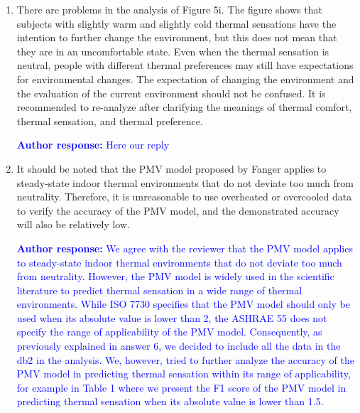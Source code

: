 \documentclass[a4paper, 10pt]{letter}
\newcommand{\response}[1]{\textcolor{blue}{\textbf{Author response:} #1}}
\begin{document}
\begin{letter}
\begin{enumerate}
            \response{
                Thank you for pointing this out.
                We made a mistake in the body manuscript and we should have written that the ``thermal sensation was measured with \sout{at least} a seven-point scale''.
                The peer-reviewed paper which describes the \ac{db2} states that the thermal sensation votes were collected using a seven-point scale and coded as follows ``-3 cold, -2 cool, -1 slightly cool, 0 neutral, +1 slightly warm, +2 warm, +3 hot''.
                We have corrected this mistake in the manuscript.
            }

            \item There are problems in the analysis of Figure 5i.
            The figure shows that subjects with slightly warm and slightly cold thermal sensations have the intention to further change the environment, but this does not mean that they are in an uncomfortable state.
            Even when the thermal sensation is neutral, people with different thermal preferences may still have expectations for environmental changes.
            The expectation of changing the environment and the evaluation of the current environment should not be confused.
            It is recommended to re-analyze after clarifying the meanings of thermal comfort, thermal sensation, and thermal preference.

            \response{Here our reply}

            \item It should be noted that the PMV model proposed by Fanger applies to steady-state indoor thermal environments that do not deviate too much from neutrality.
            Therefore, it is unreasonable to use overheated or overcooled data to verify the accuracy of the PMV model, and the demonstrated accuracy will also be relatively low.

            \response{
                We agree with the reviewer that the PMV model applies to steady-state indoor thermal environments that do not deviate too much from neutrality.
                However, the PMV model is widely used in the scientific literature to predict thermal sensation in a wide range of thermal environments.
                While ISO 7730 specifies that the PMV model should only be used when its absolute value is lower than 2, the ASHRAE 55 does not specify the range of applicability of the PMV model.
                Consequently, as previously explained in answer 6, we decided to include all the data in the \ac{db2} in the analysis.
                We, however, tried to further analyze the accuracy of the PMV model in predicting thermal sensation within its range of applicability, for example in Table 1 where we present the F1 score of the PMV model in predicting thermal sensation when its absolute value is lower than 1.5.
            }


\end{enumerate}
\end{letter}
\end{document}
